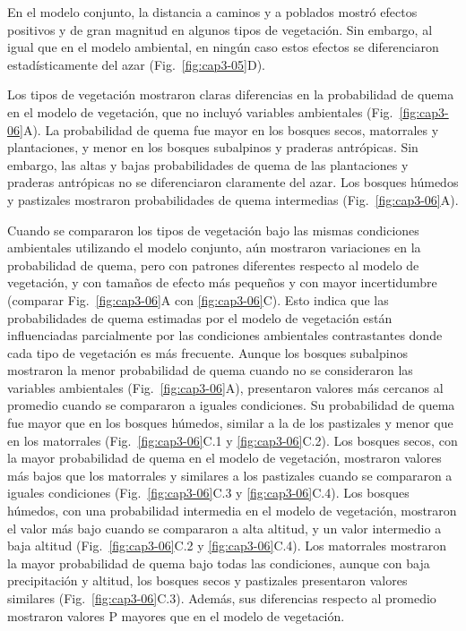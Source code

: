 En el modelo conjunto, la distancia a caminos y a poblados mostró efectos positivos y de gran magnitud en algunos tipos de vegetación. Sin embargo, al igual que en el modelo ambiental, en ningún caso estos efectos se diferenciaron
estadísticamente del azar (Fig.~\ref{fig:cap3-05}D).

Los tipos de vegetación mostraron claras diferencias en la probabilidad de quema en el modelo de vegetación, que no incluyó variables ambientales (Fig.~\ref{fig:cap3-06}A). La probabilidad de quema fue mayor en los bosques secos, matorrales y plantaciones, y menor en los bosques subalpinos y praderas antrópicas. Sin embargo, las altas y bajas probabilidades de quema de las plantaciones y praderas antrópicas no se diferenciaron claramente del azar. Los bosques húmedos y pastizales mostraron probabilidades de quema intermedias (Fig.~\ref{fig:cap3-06}A).

Cuando se compararon los tipos de vegetación bajo las mismas condiciones ambientales utilizando el modelo conjunto, aún mostraron variaciones en la probabilidad de quema, pero con patrones diferentes respecto al modelo de vegetación, y con tamaños de efecto más pequeños y con mayor incertidumbre (comparar Fig.~\ref{fig:cap3-06}A con \ref{fig:cap3-06}C). Esto indica que las probabilidades de quema estimadas por el modelo de vegetación están influenciadas parcialmente por las condiciones ambientales contrastantes donde cada tipo de vegetación es más frecuente. Aunque los bosques subalpinos mostraron la menor probabilidad de quema cuando no se consideraron las variables ambientales (Fig.~\ref{fig:cap3-06}A), presentaron valores más cercanos al promedio cuando se compararon a iguales condiciones. Su probabilidad de quema fue mayor que en los bosques húmedos, similar a la de los pastizales y menor que en los matorrales (Fig.~\ref{fig:cap3-06}C.1 y \ref{fig:cap3-06}C.2). Los bosques secos, con la mayor probabilidad de quema en el modelo de vegetación, mostraron valores más bajos que los matorrales y similares a los pastizales cuando se compararon a iguales condiciones (Fig.~\ref{fig:cap3-06}C.3 y \ref{fig:cap3-06}C.4). Los bosques húmedos, con una probabilidad intermedia en el modelo de vegetación, mostraron el valor más bajo cuando se compararon a alta altitud, y un valor intermedio a baja altitud (Fig.~\ref{fig:cap3-06}C.2 y \ref{fig:cap3-06}C.4). Los matorrales mostraron la mayor probabilidad de quema bajo todas las condiciones, aunque con baja precipitación y altitud, los bosques secos y pastizales presentaron valores similares (Fig.~\ref{fig:cap3-06}C.3). Además, sus diferencias respecto al promedio mostraron valores P mayores que en el modelo de vegetación.

